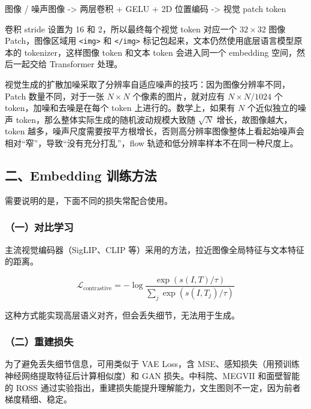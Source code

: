 图像 / 噪声图像 -\textgreater{} 两层卷积 + GELU + 2D 位置编码 -\textgreater{} 视觉 patch token

卷积 stride 设置为 16 和 2，所以最终每个视觉 token 对应一个 \(32\times32\) 图像 Patch，图像区域用 \texttt{\textless{}img\textgreater{}} 和 \texttt{\textless{}/img\textgreater{}} 标记包起来，文本仍然使用底层语言模型原本的 tokenizer，这样图像 token 和文本 token 会进入同一个 embedding 空间，然后一起交给 Transformer 处理。

视觉生成的扩散加噪采取了分辨率自适应噪声的技巧：因为图像分辨率不同，Patch 数量不同，对于一张 \(N\times N\) 个像素的图片，就对应有 \(N\times N/1024\) 个 token，加噪和去噪是在每个 token 上进行的。数学上，如果有 \(N\) 个近似独立的噪声 token，那么整体实际生成的随机波动规模大致随 \(\sqrt{N}\) 增长，故图像越大，token 越多，噪声尺度需要按平方根增长，否则高分辨率图像整体上看起始噪声会相对``窄''，导致``没有充分打乱''，flow 轨迹和低分辨率样本不在同一种尺度上。

\hypertarget{ux4e8cembedding-ux8badux7ec3ux65b9ux6cd5}{%
\subsection{二、Embedding 训练方法}\label{ux4e8cembedding-ux8badux7ec3ux65b9ux6cd5}}

需要说明的是，下面不同的损失常配合使用。

\hypertarget{ux4e00ux5bf9ux6bd4ux5b66ux4e60-1}{%
\subsubsection{（一）对比学习}\label{ux4e00ux5bf9ux6bd4ux5b66ux4e60-1}}

主流视觉编码器（SigLIP、CLIP 等）采用的方法，拉近图像全局特征与文本特征的距离。

\[
\mathcal{L}_{\mathrm{contrastive}}
=-\log\frac{\exp(s(I,T)/\tau)}
{\sum_j\exp(s(I,T_j)/\tau)}
\]

这种方式能实现高层语义对齐，但会丢失细节，无法用于生成。

\hypertarget{ux4e8cux91cdux5efaux635fux5931}{%
\subsubsection{（二）重建损失}\label{ux4e8cux91cdux5efaux635fux5931}}

为了避免丢失细节信息，可用类似于 VAE Loss，含 MSE、感知损失（用预训练神经网络提取特征后计算相似度）和 GAN 损失。中科院、MEGVII 和面壁智能的 ROSS 通过实验指出，重建损失能提升理解能力，文生图则不一定，因为前者梯度精细、稳定。

